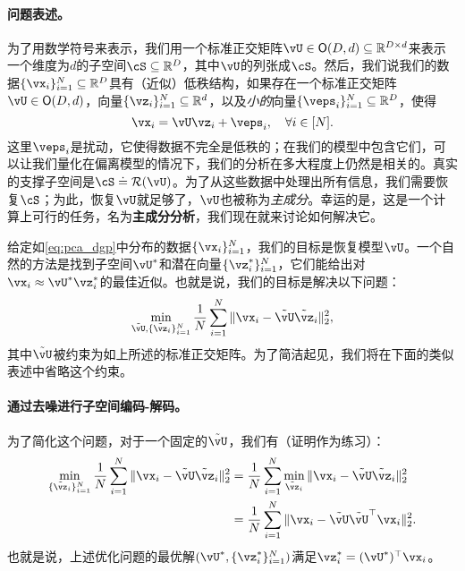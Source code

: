 \documentclass[../../book-main_zh.tex]{subfiles}
\begin{document}
\paragraph{问题表述。}
为了用数学符号来表示，我们用一个标准正交矩阵\(\vU \in \O(D, d) \subseteq \R^{D \times d}\)来表示一个维度为\(d\)的子空间\(\cS \subseteq \R^{D}\)，其中\(\vU\)的列张成\(\cS\)。然后，我们说我们的数据\(\{\vx_{i}\}_{i = 1}^{N} \subseteq \R^{D}\)具有（近似）低秩结构，如果存在一个标准正交矩阵\(\vU \in \O(D, d)\)，向量\(\{\vz_{i}\}_{i = 1}^{N} \subseteq \R^{d}\)，以及\textit{小的}向量\(\{\veps_{i}\}_{i = 1}^{N} \subseteq \R^{D}\)，使得
\begin{equation}\label{eq:pca_dgp}
    \vx_{i} = \vU\vz_{i} + \veps_{i}, \quad \forall i \in [N].
\end{equation}
这里\(\veps_{i}\)是扰动，它使得数据不完全是低秩的；在我们的模型中包含它们，可以让我们量化在偏离模型的情况下，我们的分析在多大程度上仍然是相关的。真实的支撑子空间是\(\cS \doteq \Range(\vU)\)。为了从这些数据中处理出所有信息，我们需要恢复\(\cS\)；为此，恢复\(\vU\)就足够了，\(\vU\)也被称为\textit{主成分}。幸运的是，这是一个计算上可行的任务，名为{\bf 主成分分析}，我们现在就来讨论如何解决它。

给定如\eqref{eq:pca_dgp}中分布的数据\(\{\vx_{i}\}_{i = 1}^{N}\)，我们的目标是恢复模型\(\vU\)。一个自然的方法是找到子空间\(\vU^{\ast}\)和潜在向量\(\{\vz_{i}^{\ast}\}_{i = 1}^{N}\)，它们能给出对\(\vx_{i} \approx \vU^{\ast}\vz_{i}^{\ast}\)的最佳近似。也就是说，我们的目标是解决以下问题：
\begin{equation}\label{eq:pca_sparse_recovery_problem}
    \min_{\tilde{\vU}, \{\tilde{\vz}_{i}\}_{i = 1}^{N}}\frac{1}{N}\sum_{i = 1}^{N}\norm{\vx_{i} - \tilde{\vU}\tilde{\vz}_{i}}_{2}^{2},
\end{equation}
其中\(\tilde{\vU}\)被约束为如上所述的标准正交矩阵。为了简洁起见，我们将在下面的类似表述中省略这个约束。

\paragraph{通过去噪进行子空间编码-解码。}
为了简化这个问题，对于一个固定的\(\tilde{\vU}\)，我们有（证明作为练习）：
\begin{align}
    \min_{\{\tilde{\vz}_{i}\}_{i = 1}^{N}}\frac{1}{N}\sum_{i = 1}^{N}\norm{\vx_{i} - \tilde{\vU}\tilde{\vz}_{i}}_{2}^{2} 
    &= \frac{1}{N}\sum_{i = 1}^{N}\min_{\tilde{\vz}_{i}}\norm{\vx_{i} - \tilde{\vU}\tilde{\vz}_{i}}_{2}^{2} \\
    &= \frac{1}{N}\sum_{i = 1}^{N}\norm{\vx_{i} - \tilde{\vU}\tilde{\vU}^{\top}\vx_{i}}_{2}^{2}. 
\end{align}
也就是说，上述优化问题的最优解\((\vU^{\ast}, \{\vz_{i}^{\ast}\}_{i = 1}^{N})\)满足$\vz_i^{\ast} = (\vU^{\ast})^\top\vx_i$。
\end{document}
